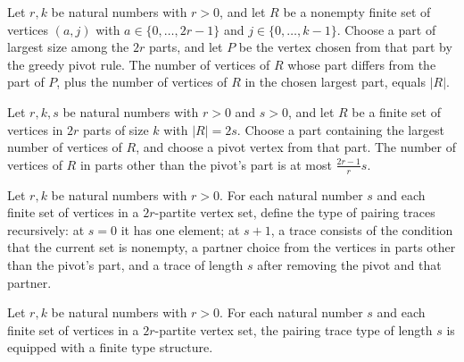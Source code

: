 \begin{theorem}
\label{FABL.card_greedyPartnerChoices_add_largest}
\leanok
{}
Let $r,k$ be natural numbers with $r>0$, and let $R$ be a nonempty finite set of
vertices $(a,j)$ with $a\in\{0,\ldots,2r-1\}$ and $j\in\{0,\ldots,k-1\}$. Choose
a part of largest size among the $2r$ parts, and let $P$ be the vertex chosen from that
part by the greedy pivot rule. The number of vertices of $R$ whose part differs from the
part of $P$, plus the number of vertices of $R$ in the chosen largest part, equals
$|R|$.
\end{theorem}

\begin{theorem}
\label{FABL.card_greedyPartnerChoices_le}
\leanok
{}
Let $r,k,s$ be natural numbers with $r>0$ and $s>0$, and let $R$ be a finite set of
vertices in $2r$ parts of size $k$ with $|R|=2s$. Choose a part containing the largest
number of vertices of $R$, and choose a pivot vertex from that part. The number of
vertices of $R$ in parts other than the pivot's part is at most $\frac{2r-1}{r}s$.
\end{theorem}

\begin{definition}
\label{FABL.PartitePairingTrace}
\leanok
{}
Let $r,k$ be natural numbers with $r>0$. For each natural number $s$ and each finite set
of vertices in a $2r$-partite vertex set, define the type of pairing traces recursively:
at $s=0$ it has one element; at $s+1$, a trace consists of the condition that the
current set is nonempty, a partner choice from the vertices in parts other than the
pivot's part, and a trace of length $s$ after removing the pivot and that partner.
\end{definition}

\begin{definition}
\label{FABL.partitePairingTraceFintype}
\leanok
{}
Let $r,k$ be natural numbers with $r>0$. For each natural number $s$ and each finite set
of vertices in a $2r$-partite vertex set, the pairing trace type of length $s$ is
equipped with a finite type structure.
\end{definition}

